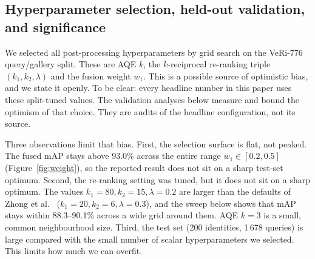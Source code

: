 \subsection{Hyperparameter selection, held-out validation, and significance}
\label{sec:holdout}
We selected all post-processing hyperparameters by grid search on the VeRi-776 query/gallery split. These are AQE $k$, the $k$-reciprocal re-ranking triple $(k_1,k_2,\lambda)$ and the fusion weight $w_1$. This is a possible source of optimistic bias, and we state it openly. To be clear: every headline number in this paper uses these split-tuned values. The validation analyses below measure and bound the optimism of that choice. They are audits of the headline configuration, not its source.

Three observations limit that bias. First, the selection surface is flat, not peaked. The fused mAP stays above $93.0\%$ across the entire range $w_1\in[0.2,0.5]$ (Figure~\ref{fig:weight}), so the reported result does not sit on a sharp test-set optimum. Second, the re-ranking setting was tuned, but it does not sit on a sharp optimum. The values $k_1{=}80,k_2{=}15,\lambda{=}0.2$ are larger than the defaults of Zhong et al.~\cite{zhong2017rerank} ($k_1{=}20,k_2{=}6,\lambda{=}0.3$), and the sweep below shows that mAP stays within 88.3--90.1\% across a wide grid around them. AQE $k{=}3$ is a small, common neighbourhood size. Third, the test set (200 identities, 1\,678 queries) is large compared with the small number of scalar hyperparameters we selected. This limits how much we can overfit.
